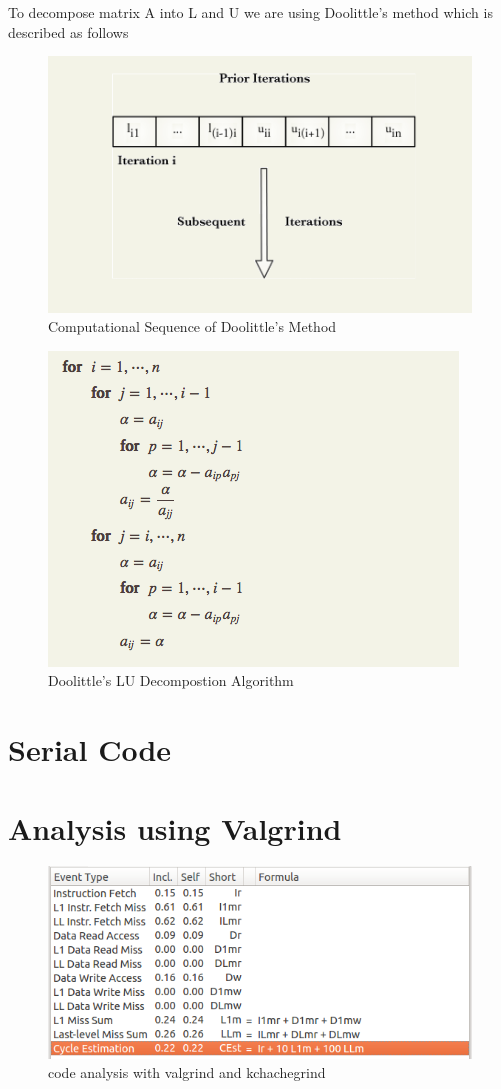 \documentclass{sem5}
\begin{document}
To decompose matrix A into L and U we are using Doolittle's method which is described as follows
\begin{figure}[htbp]
\centering
\includegraphics[scale=.5]{1.png}
\caption{Computational Sequence of Doolittle's Method}
\end{figure}
\begin{figure}
\centering
\includegraphics[scale=.5]{2.png}
\caption{Doolittle's LU Decompostion Algorithm}
\end{figure}
\newpage
\section{Serial Code}

\newpage
\section{Analysis using Valgrind}
\begin{figure}[htbp]
\centering
\includegraphics[scale=.5]{11.png}
\caption{code analysis with valgrind and kchachegrind}
\end{figure}
\end{document}
